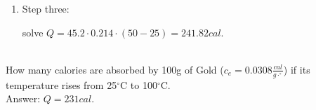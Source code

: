 \documentclass[main.tex]{subfiles}
\begin{document}
\begin{description}
\begin{example}
\begin{enumerate}[label=\protect\circled{\color{white}\arabic*}]
\begin{tikzpicture}[overlay, remember picture,node distance =1.5cm]
\end{tikzpicture}\vspace{12mm} %
\item \begin{bf}Step three:\end{bf} solve $Q=45.2\cdot 0.214\cdot  (50-25)=241.82cal$.
\end{enumerate}
\faDiamond\ \\
How many calories are absorbed by 100g of Gold ($c_e=0.0308\frac{cal}{g\cdot^{\circ}}$) if its temperature rises from 25$^{\circ}$C to 100$^{\circ}$C. \\
\flushright Answer: $Q=231cal$.
\end{example}%



\end{description}
\end{document}
